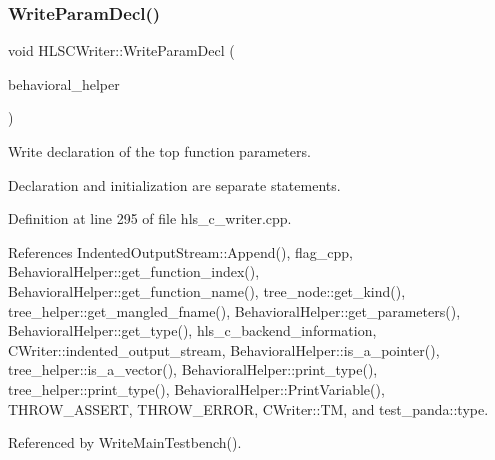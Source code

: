 \subsubsection{\texorpdfstring{Write\+Param\+Decl()}{WriteParamDecl()}}
{\footnotesize\ttfamily void H\+L\+S\+C\+Writer\+::\+Write\+Param\+Decl (\begin{DoxyParamCaption}\item[{const \hyperlink{behavioral__helper_8hpp_aae973b54cac87eef3b27442aa3e1e425}{Behavioral\+Helper\+Const\+Ref}}]{behavioral\+\_\+helper }\end{DoxyParamCaption})\hspace{0.3cm}{\ttfamily [protected]}}



Write declaration of the top function parameters. 

Declaration and initialization are separate statements. 

Definition at line 295 of file hls\+\_\+c\+\_\+writer.\+cpp.



References Indented\+Output\+Stream\+::\+Append(), flag\+\_\+cpp, Behavioral\+Helper\+::get\+\_\+function\+\_\+index(), Behavioral\+Helper\+::get\+\_\+function\+\_\+name(), tree\+\_\+node\+::get\+\_\+kind(), tree\+\_\+helper\+::get\+\_\+mangled\+\_\+fname(), Behavioral\+Helper\+::get\+\_\+parameters(), Behavioral\+Helper\+::get\+\_\+type(), hls\+\_\+c\+\_\+backend\+\_\+information, C\+Writer\+::indented\+\_\+output\+\_\+stream, Behavioral\+Helper\+::is\+\_\+a\+\_\+pointer(), tree\+\_\+helper\+::is\+\_\+a\+\_\+vector(), Behavioral\+Helper\+::print\+\_\+type(), tree\+\_\+helper\+::print\+\_\+type(), Behavioral\+Helper\+::\+Print\+Variable(), T\+H\+R\+O\+W\+\_\+\+A\+S\+S\+E\+RT, T\+H\+R\+O\+W\+\_\+\+E\+R\+R\+OR, C\+Writer\+::\+TM, and test\+\_\+panda\+::type.



Referenced by Write\+Main\+Testbench().

